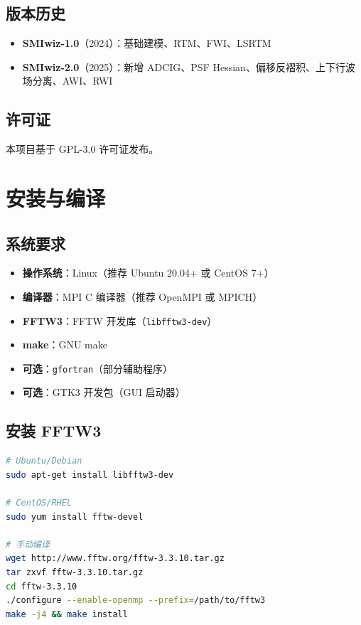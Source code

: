 \documentclass[11pt,a4paper]{ctexart}
\begin{document}
\subsection{版本历史}

\begin{itemize}
  \item \textbf{SMIwiz-1.0}（2024）：基础建模、RTM、FWI、LSRTM
  \item \textbf{SMIwiz-2.0}（2025）：新增 ADCIG、PSF Hessian、偏移反褶积、上下行波场分离、AWI、RWI
\end{itemize}

\subsection{许可证}

本项目基于 GPL-3.0 许可证发布。

\section{安装与编译}

\subsection{系统要求}

\begin{itemize}
  \item \textbf{操作系统}：Linux（推荐 Ubuntu 20.04+ 或 CentOS 7+）
  \item \textbf{编译器}：MPI C 编译器（推荐 OpenMPI 或 MPICH）
  \item \textbf{FFTW3}：FFTW 开发库（\texttt{libfftw3-dev}）
  \item \textbf{make}：GNU make
  \item \textbf{可选}：\texttt{gfortran}（部分辅助程序）
  \item \textbf{可选}：GTK3 开发包（GUI 启动器）
\end{itemize}

\subsection{安装 FFTW3}

\begin{lstlisting}[language=bash]
# Ubuntu/Debian
sudo apt-get install libfftw3-dev

# CentOS/RHEL
sudo yum install fftw-devel

# 手动编译
wget http://www.fftw.org/fftw-3.3.10.tar.gz
tar zxvf fftw-3.3.10.tar.gz
cd fftw-3.3.10
./configure --enable-openmp --prefix=/path/to/fftw3
make -j4 && make install
\end{lstlisting}
\end{document}
